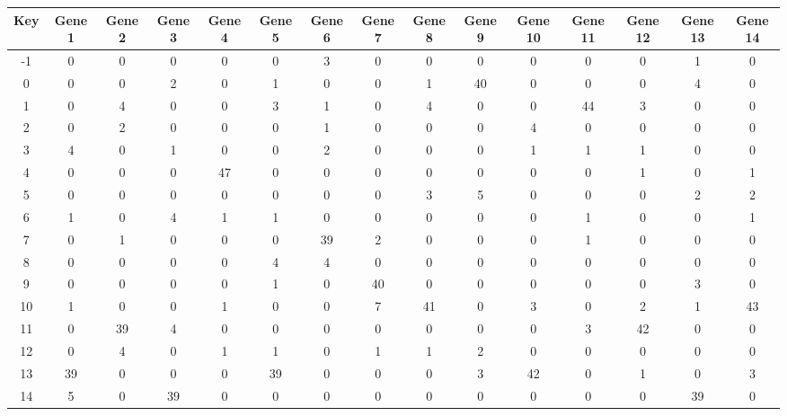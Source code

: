 \begin{tabular}{|c|c|c|c|c|c|c|c|c|c|c|c|c|c|c|}
\hline
Key & Gene 1 & Gene 2 & Gene 3 & Gene 4 & Gene 5 & Gene 6 & Gene 7 & Gene 8 & Gene 9 & Gene 10 & Gene 11 & Gene 12 & Gene 13 & Gene 14 \\
\hline
-1 & 0 & 0 & 0 & 0 & 0 & 3 & 0 & 0 & 0 & 0 & 0 & 0 & 1 & 0 \\
0 & 0 & 0 & 2 & 0 & 1 & 0 & 0 & 1 & 40 & 0 & 0 & 0 & 4 & 0 \\
1 & 0 & 4 & 0 & 0 & 3 & 1 & 0 & 4 & 0 & 0 & 44 & 3 & 0 & 0 \\
2 & 0 & 2 & 0 & 0 & 0 & 1 & 0 & 0 & 0 & 4 & 0 & 0 & 0 & 0 \\
3 & 4 & 0 & 1 & 0 & 0 & 2 & 0 & 0 & 0 & 1 & 1 & 1 & 0 & 0 \\
4 & 0 & 0 & 0 & 47 & 0 & 0 & 0 & 0 & 0 & 0 & 0 & 1 & 0 & 1 \\
5 & 0 & 0 & 0 & 0 & 0 & 0 & 0 & 3 & 5 & 0 & 0 & 0 & 2 & 2 \\
6 & 1 & 0 & 4 & 1 & 1 & 0 & 0 & 0 & 0 & 0 & 1 & 0 & 0 & 1 \\
7 & 0 & 1 & 0 & 0 & 0 & 39 & 2 & 0 & 0 & 0 & 1 & 0 & 0 & 0 \\
8 & 0 & 0 & 0 & 0 & 4 & 4 & 0 & 0 & 0 & 0 & 0 & 0 & 0 & 0 \\
9 & 0 & 0 & 0 & 0 & 1 & 0 & 40 & 0 & 0 & 0 & 0 & 0 & 3 & 0 \\
10 & 1 & 0 & 0 & 1 & 0 & 0 & 7 & 41 & 0 & 3 & 0 & 2 & 1 & 43 \\
11 & 0 & 39 & 4 & 0 & 0 & 0 & 0 & 0 & 0 & 0 & 3 & 42 & 0 & 0 \\
12 & 0 & 4 & 0 & 1 & 1 & 0 & 1 & 1 & 2 & 0 & 0 & 0 & 0 & 0 \\
13 & 39 & 0 & 0 & 0 & 39 & 0 & 0 & 0 & 3 & 42 & 0 & 1 & 0 & 3 \\
14 & 5 & 0 & 39 & 0 & 0 & 0 & 0 & 0 & 0 & 0 & 0 & 0 & 39 & 0 \\
\hline
\end{tabular}